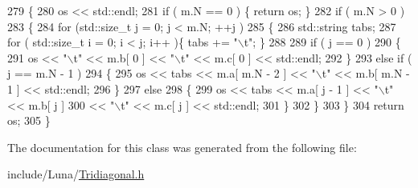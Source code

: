 \begin{DoxyCode}
279   \{
280     os << std::endl;
281     \textcolor{keywordflow}{if} ( m.N == 0 ) \{ \textcolor{keywordflow}{return} os; \}
282     \textcolor{keywordflow}{if} ( m.N > 0 )
283     \{
284       \textcolor{keywordflow}{for} (std::size\_t j = 0; j < m.N; ++j )
285       \{
286         std::string tabs;
287         \textcolor{keywordflow}{for} ( std::size\_t i = 0; i < j; i++ )\{ tabs += \textcolor{stringliteral}{"\(\backslash\)t"}; \}
288 
289         \textcolor{keywordflow}{if} ( j == 0 )
290         \{
291           os << \textcolor{stringliteral}{"\(\backslash\)t"} << m.b[ 0 ] << \textcolor{stringliteral}{"\(\backslash\)t"} << m.c[ 0 ] << std::endl;
292         \}
293         \textcolor{keywordflow}{else} \textcolor{keywordflow}{if} ( j == m.N - 1 )
294         \{
295           os << tabs << m.a[ m.N - 2 ] << \textcolor{stringliteral}{"\(\backslash\)t"} << m.b[ m.N - 1 ] << std::endl;
296         \}
297         \textcolor{keywordflow}{else}
298         \{
299           os << tabs << m.a[ j - 1 ] << \textcolor{stringliteral}{"\(\backslash\)t"} << m.b[ j ]
300              << \textcolor{stringliteral}{"\(\backslash\)t"} << m.c[ j ] << std::endl;
301         \}
302       \}
303     \}
304     \textcolor{keywordflow}{return} os;
305   \}
\end{DoxyCode}


The documentation for this class was generated from the following file\+:\begin{DoxyCompactItemize}
\item 
include/\+Luna/\hyperlink{Tridiagonal_8h}{Tridiagonal.\+h}\end{DoxyCompactItemize}
